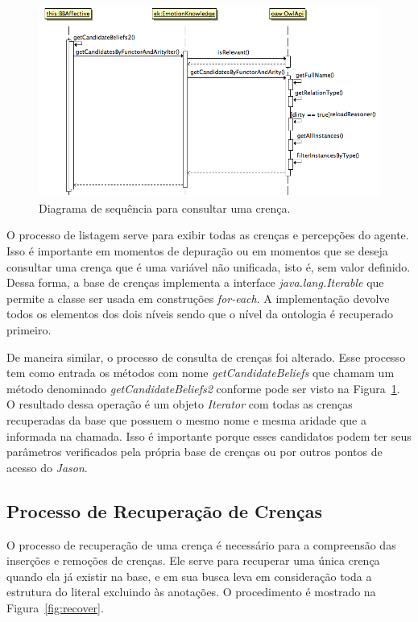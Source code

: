 \begin{figure}
  \centering
  \includegraphics[width=12cm]{figuras/sd-getCB.png}
  \caption{Diagrama de sequência para consultar uma crença.}
  \label{fig:getCandidates}
\end{figure}

O processo de listagem serve para exibir todas as crenças e percepções do
agente. Isso é importante em momentos de depuração ou em momentos que se
deseja consultar uma crença que é uma variável não unificada, isto é, sem
valor definido. Dessa forma, a base de crenças implementa a interface
\emph{java.lang.Iterable} que permite a classe ser usada em construções
\emph{for-each}. A implementação devolve todos os elementos dos dois níveis
sendo que o nível da ontologia é recuperado primeiro.

De maneira similar, o processo de consulta de crenças foi alterado.
Esse processo tem como entrada os métodos com nome \emph{getCandidateBeliefs}
que chamam um método denominado \emph{getCandidateBeliefs2} conforme
pode ser visto na Figura~\ref{fig:getCandidates}. O resultado dessa operação é
um objeto \emph{Iterator} com todas as crenças recuperadas da base que possuem
o mesmo nome e mesma aridade que a informada na chamada. Isso é importante
porque esses candidatos podem ter seus parâmetros verificados pela própria
base de crenças ou por outros pontos de acesso do \emph{Jason}.

\subsection{Processo de Recuperação de Crenças}

O processo de recuperação de uma crença é necessário para a compreensão das
inserções e remoções de crenças. Ele serve para recuperar uma única crença
quando ela já existir na base, e em sua busca leva em consideração toda a
estrutura do literal excluindo às anotações. O procedimento é mostrado na
Figura~\ref{fig:recover}.

